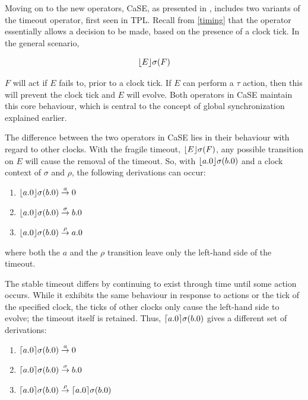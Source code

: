 Moving on to the new operators, CaSE, as presented in
\cite{norton05alg}, includes two variants of the timeout operator,
first seen in TPL.  Recall from \ref{timing} that the operator
essentially allows a decision to be made, based on the presence of a
clock tick.  In the general scenario,

\begin{equation}
\lfloor{E}\rfloor {\sigma} ({F})
\end{equation}

\noindent $F$ will act if $E$ fails to, prior to a clock tick.  If $E$
can perform a $\tau$ action, then this will prevent the clock tick and
$E$ will evolve. Both operators in CaSE maintain this core behaviour,
which is central to the concept of global synchronization explained
earlier.

The difference between the two operators in CaSE lies in their
behaviour with regard to other clocks.  With the fragile timeout,
$\lfloor{E}\rfloor {\sigma} ({F})$, any possible transition on $E$ will cause the
removal of the timeout.  So, with $\lfloor{a.0}\rfloor {\sigma} ({b.0})$ and a clock
context of $\sigma$ and $\rho$, the following derivations can occur:

\begin{enumerate}
\item $\lfloor{a.0}\rfloor {\sigma} ({b.0}) \stackrel{a}{\rightarrow} 0$
\item $\lfloor{a.0}\rfloor {\sigma} ({b.0}) \stackrel{\sigma}{\rightarrow} b.0$
\item $\lfloor{a.0}\rfloor {\sigma} ({b.0}) \stackrel{\rho}{\rightarrow} a.0$
\end{enumerate}

\noindent where both the $a$ and the $\rho$ transition leave only the
left-hand side of the timeout.

The stable timeout differs by continuing to exist through time until
some action occurs.  While it exhibits the same behaviour in response
to actions or the tick of the specified clock, the ticks of other
clocks only cause the left-hand side to evolve; the timeout itself is
retained.  Thus, $\lceil{a.0}\rceil {\sigma} ({b.0})$ gives a different set
of derivations:

\begin{enumerate}
\item $\lceil{a.0}\rceil {\sigma} ({b.0}) \stackrel{a}{\rightarrow} 0$
\item $\lceil{a.0}\rceil {\sigma} ({b.0}) \stackrel{\sigma}{\rightarrow} b.0$
\item $\lceil{a.0}\rceil {\sigma} ({b.0}) \stackrel{\rho}{\rightarrow} \lceil{a.0}\rceil {\sigma} ({b.0})$
\end{enumerate}

